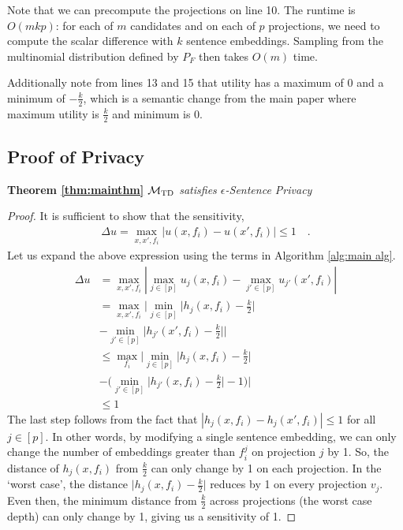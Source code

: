 Note that we can precompute the projections on line 10. The runtime is $O(mkp)$: for each of $m$ candidates and on each of $p$ projections, we need to compute the scalar difference with $k$ sentence embeddings. Sampling from the multinomial distribution defined by $P_F$ then takes $O(m)$ time. 

Additionally note from lines 13 and 15 that utility has a maximum of 0 and a minimum of $-\frac{k}{2}$, which is a semantic change from the main paper where maximum utility is $\frac{k}{2}$ and minimum is 0. 

\subsection{Proof of Privacy}

\textbf{Theorem \ref{thm:mainthm}} \emph{
	$\mathcal{M}_{\text{TD}}$ satisfies $\epsilon$-Sentence Privacy
}
\begin{proof}

	It is sufficient to show that the sensitivity, 
	\begin{align*}
		\Delta u = \max_{x, x', f_i} | u(x,f_i) - u(x', f_i)| \leq 1 \quad . 
	\end{align*} 
	Let us expand the above expression using the terms in Algorithm \ref{alg:main alg}. 
	\begin{align*}
		\Delta u &= \max_{x, x', f_i} | \max_{j \in [p]} u_j(x,f_i)  - \max_{j' \in [p]} u_{j'}(x',f_i)| \\ 
		&= \max_{x, x', f_i} | \min_{j \in [p]} \big| h_j(x,f_i) - \frac{k}{2} \big|  \\
		&- \min_{j' \in [p]} \big| h_{j'}(x',f_i) - \frac{k}{2} \big|| \\
		&\leq \max_{ f_i} | \min_{j \in [p]} \big| h_j(x,f_i) - \frac{k}{2} \big|  \\
		&- \big( \min_{j' \in [p]} \big| h_{j'}(x,f_i) - \frac{k}{2} \big|-1\big) | \\
		&\leq 1
	\end{align*}
	The last step follows from the fact that $|h_j(x, f_i) - h_j(x', f_i)| \leq 1$ for all $j \in [p]$. In other words, by modifying a single sentence embedding, we can only change the number of embeddings greater than $f_i^j$ on projection $j$ by 1. So, the distance of $h_j(x, f_i)$ from $\frac{k}{2}$ can only change by 1 on each projection. In the `worst case', the distance $\big| h_j(x,f_i) - \frac{k}{2} \big|$ reduces by 1 on every projection $v_j$. Even then, the minimum distance from $\frac{k}{2}$ across projections (the worst case depth) can only change by 1, giving us a sensitivity of 1. 
\end{proof}





